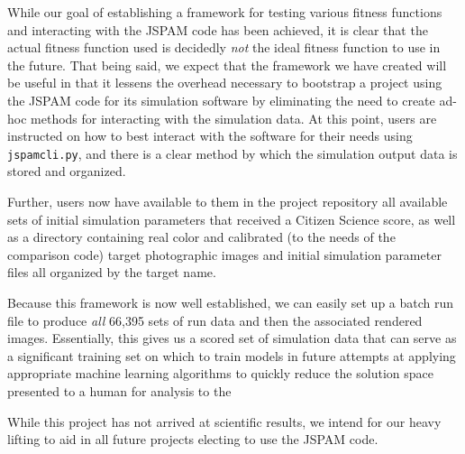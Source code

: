 While our goal of establishing a framework for testing various fitness functions
and interacting with the JSPAM code has been achieved, it is clear that the
actual fitness function used is decidedly \textit{not} the ideal fitness
function to use in the future. That being said, we expect that the framework
we have created will be useful in that it lessens the overhead necessary to
bootstrap a project using the JSPAM code for its simulation software by
eliminating the need to create ad-hoc methods for interacting with the
simulation data. At this point, users are instructed on how to best interact
with the software for their needs using \texttt{jspamcli.py}, and there is a
clear method by which the simulation output data is stored and organized.

Further, users now have available to them in the project repository all
available sets of initial simulation parameters that received a Citizen Science
score, as well as a directory containing real color and calibrated (to the needs
of the comparison code) target photographic images and initial simulation
parameter files all organized by the target name.

Because this framework is now well established, we can easily set up a batch run
file to produce \textit{all} 66,395 sets of run data and then the associated
rendered images. Essentially, this gives us a scored set of simulation data that
can serve as a significant training set on which to train models in future
attempts at applying appropriate machine learning algorithms to quickly reduce
the solution space presented to a human for analysis to the 

While this project has not arrived at scientific results, we intend for our
heavy lifting to aid in all future projects electing to use the JSPAM code.
